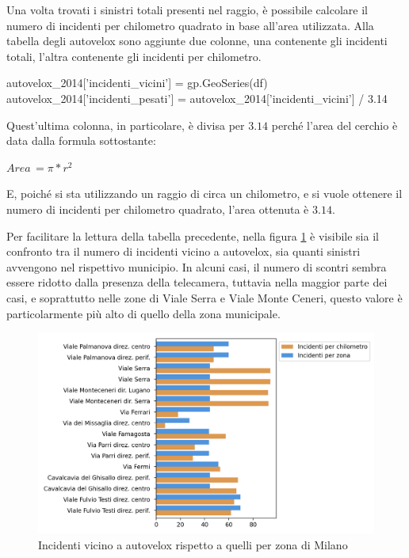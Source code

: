 \documentclass[a4paper,12pt]{report}
\begin{document}

Una volta trovati i sinistri totali presenti nel raggio, 
è possibile calcolare il numero di incidenti per chilometro quadrato 
in base all'area utilizzata.
Alla tabella degli autovelox sono aggiunte due colonne, una contenente gli incidenti totali, 
l'altra contenente gli incidenti per chilometro.

\begin{code}
autovelox_2014['incidenti_vicini'] = gp.GeoSeries(df)
autovelox_2014['incidenti_pesati'] = autovelox_2014['incidenti_vicini'] / 3.14
\end{code}

Quest'ultima colonna, in particolare, è divisa per $3.14$ perché l'area del cerchio 
è data dalla formula sottostante: 

\begin{center}
    $Area\, = \pi * r^2$
\end{center}

E, poiché si sta utilizzando un raggio di circa un chilometro, e si vuole ottenere il 
numero di incidenti per chilometro quadrato, l'area ottenuta è $3.14$.

Per facilitare la lettura della tabella precedente, nella figura \ref{fig:confronto-autovelox} 
è visibile sia il confronto tra il numero di incidenti vicino a autovelox, 
sia quanti sinistri avvengono nel rispettivo municipio.
In alcuni casi, il numero di scontri sembra essere ridotto dalla presenza della telecamera,  
tuttavia nella maggior parte dei casi, e soprattutto nelle zone di Viale Serra e 
Viale Monte Ceneri, questo valore è particolarmente più alto di 
quello della zona municipale.

\begin{figure}
    \includegraphics[width=\linewidth]{../src/municipi_milano/conclusioni_municipio.png}
    \caption{Incidenti vicino a autovelox rispetto a quelli per zona di Milano}
    \label{fig:confronto-autovelox}
\end{figure}
\end{document}
